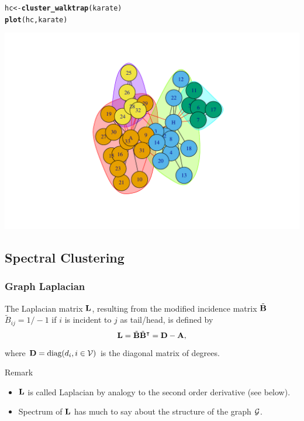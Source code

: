 \documentclass{beamer}\usepackage[]{graphicx}\usepackage[]{color}
\makeatletter
\newcommand{\hlstd}[1]{\textcolor[rgb]{0.345,0.345,0.345}{#1}}%
\newcommand{\hlkwb}[1]{\textcolor[rgb]{0.69,0.353,0.396}{#1}}%
\newcommand{\hlkwd}[1]{\textcolor[rgb]{0.737,0.353,0.396}{\textbf{#1}}}%
\newenvironment{kframe}{%
 \def\at@end@of@kframe{}%
 \ifinner\ifhmode%
  \def\at@end@of@kframe{\end{minipage}}%
  \begin{minipage}{\columnwidth}%
 \fi\fi%
 \def\FrameCommand##1{\hskip\@totalleftmargin \hskip-\fboxsep
 \colorbox{shadecolor}{##1}\hskip-\fboxsep
     \hskip-\linewidth \hskip-\@totalleftmargin \hskip\columnwidth}%
 \MakeFramed {\advance\hsize-\width
   \@totalleftmargin\z@ \linewidth\hsize
   \@setminipage}}%
 {\par\unskip\endMakeFramed%
 \at@end@of@kframe}
\newenvironment{knitrout}{}{} %
\makeatother
\begin{document}
\begin{frame}
\begin{knitrout}
\end{knitrout}

\begin{knitrout}\scriptsize
{}\color{fgcolor}\begin{kframe}
\begin{alltt}
\hlstd{hc} \hlkwb{<-} \hlkwd{cluster_walktrap}\hlstd{(karate)}
\hlkwd{plot}\hlstd{(hc,karate)}
\end{alltt}
\end{kframe}
\includegraphics[width=.8\textwidth]{figures/unnamed-chunk-4-1} 

\end{knitrout}

\end{frame}

\subsection{Spectral Clustering}

\begin{frame}
  \frametitle{Graph Laplacian}

  \begin{definition}
    The Laplacian matrix $\mathbf{L}$, resulting from the modified incidence matrix $\tilde{\mathbf{B}}$ $\tilde{\! B}_{ij}= 1/-1$ if $i$ is incident to $j$ as tail/head, is defined by 
    \[
      \mathbf{L} = \tilde {\mathbf{B}} \tilde {\mathbf{B}}^\intercal = \mathbf{D} - \mathbf{A},
    \]
    where $\mathbf{D} = \text{diag}(d_i, i\in\mathcal{V})$ is the diagonal matrix of degrees. 
  \end{definition}

  \begin{block}{Remark}
    \begin{itemize}
    \item $\mathbf{L}$ is called Laplacian by analogy to the second order derivative (see below).
    \item Spectrum of $\mathbf{L}$ has much to say about the structure of the graph $\mathcal{G}$.
    \end{itemize}
  \end{block}

\end{frame}
\end{document}
